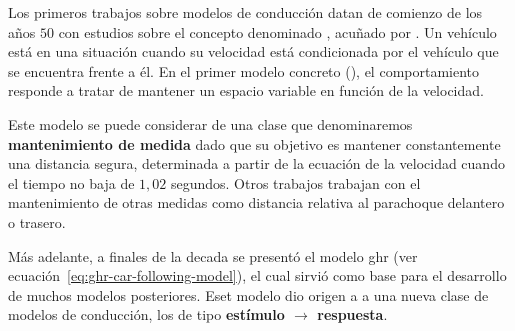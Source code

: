 Los primeros trabajos sobre modelos de conducción datan de comienzo de los años $50$ con estudios sobre el concepto denominado \textbf{}, acuñado por \cite{reuschel1950fahrzeugbewegungen}. Un vehículo está en una situación  cuando su velocidad está condicionada por el vehículo que se encuentra frente a él. En el primer modelo concreto (\cite{Pipes1953}), el comportamiento responde a tratar de mantener un espacio variable en función de la velocidad.

Este modelo se puede considerar de una clase que denominaremos \textbf{mantenimiento de medida} dado que su objetivo es mantener constantemente una distancia segura, determinada a partir de la ecuación de la velocidad cuando el tiempo no baja de $1,02$ segundos. Otros trabajos trabajan con el mantenimiento de otras medidas como distancia relativa al parachoque delantero o trasero.


Más adelante, a finales de la decada se presentó el modelo \gls{ghr} (ver ecuación~\ref{eq:ghr-car-following-model}), el cual sirvió como base para el desarrollo de muchos modelos posteriores. Eset modelo dio origen a a una nueva clase de modelos de conducción, los de tipo \textbf{estímulo $\rightarrow$ respuesta}. 

